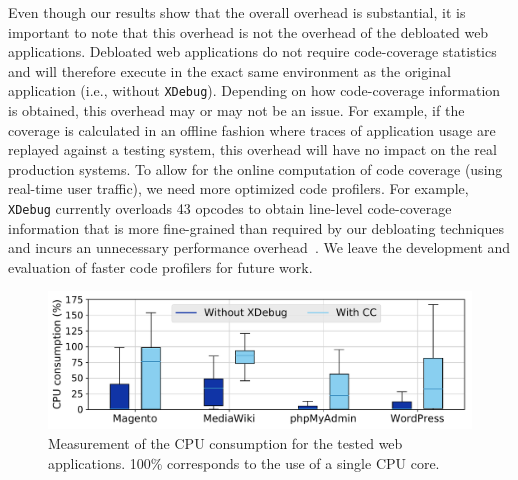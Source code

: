 Even though our results show that the overall overhead is substantial, it is
important to note that this overhead is not the overhead of the debloated
web applications. Debloated web applications do not require code-coverage
statistics and will therefore execute in the exact same environment as
the original application (i.e., without \texttt{XDebug}). Depending on how
code-coverage information is obtained, this overhead may or may not be an
issue. For example, if the coverage is calculated in an offline fashion
where traces of application usage are replayed against a testing system,
this overhead will have no impact on the real production systems. To allow
for the online computation of code coverage (using real-time user traffic),
we need more optimized code profilers. For example, \texttt{XDebug} currently
overloads 43 opcodes to obtain line-level code-coverage information that
is more fine-grained than required by our debloating techniques and incurs
an unnecessary performance overhead~\cite{xdebug-performance2}. We leave
the development and evaluation of faster code profilers for future work.

\begin{figure}[t]
  \includegraphics[width=\linewidth]{figures/lim/cpu.pdf}
  \caption{Measurement of the CPU consumption for the tested web
  applications. 100\% corresponds to the use of a single CPU core.}
  \label{fig:cpu}
\end{figure}